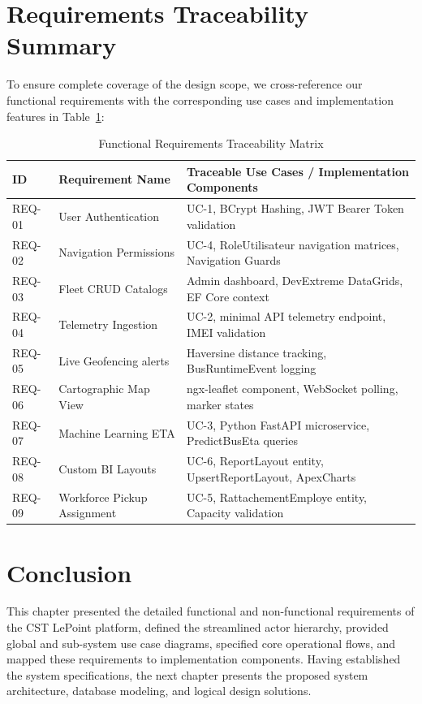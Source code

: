 \section{Requirements Traceability Summary}

To ensure complete coverage of the design scope, we cross-reference our functional requirements with the corresponding use cases and implementation features in Table~\ref{tab:traceability_matrix}:

\begin{table}[H]
  \small
  \centering
  \begin{tabularx}{\textwidth}{lXX}
    \toprule
    \textbf{ID} & \textbf{Requirement Name} & \textbf{Traceable Use Cases / Implementation Components} \\
    \midrule
    REQ-01 & User Authentication & UC-1, BCrypt Hashing, JWT Bearer Token validation \\
    REQ-02 & Navigation Permissions & UC-4, RoleUtilisateur navigation matrices, Navigation Guards \\
    REQ-03 & Fleet CRUD Catalogs & Admin dashboard, DevExtreme DataGrids, EF Core context \\
    REQ-04 & Telemetry Ingestion & UC-2, minimal API telemetry endpoint, IMEI validation \\
    REQ-05 & Live Geofencing alerts & Haversine distance tracking, BusRuntimeEvent logging \\
    REQ-06 & Cartographic Map View & ngx-leaflet component, WebSocket polling, marker states \\
    REQ-07 & Machine Learning ETA & UC-3, Python FastAPI microservice, PredictBusEta queries \\
    REQ-08 & Custom BI Layouts & UC-6, ReportLayout entity, UpsertReportLayout, ApexCharts \\
    REQ-09 & Workforce Pickup Assignment & UC-5, RattachementEmploye entity, Capacity validation \\
    \bottomrule
  \end{tabularx}
  \caption{Functional Requirements Traceability Matrix}
  \label{tab:traceability_matrix}
\end{table}

\section{Conclusion}

This chapter presented the detailed functional and non-functional requirements of the CST LePoint platform, defined the streamlined actor hierarchy, provided global and sub-system use case diagrams, specified core operational flows, and mapped these requirements to implementation components. Having established the system specifications, the next chapter presents the proposed system architecture, database modeling, and logical design solutions.
